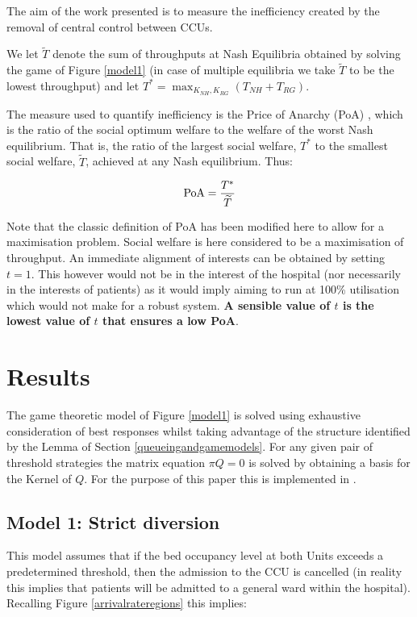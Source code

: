 \documentclass{article}
\begin{document}
The aim of the work presented is to measure the inefficiency created by the removal of central control between CCUs.

We let $\widetilde T$ denote the sum of throughputs at Nash Equilibria obtained by solving the game of Figure \ref{model1} (in case of multiple equilibria we take $\widetilde T$ to be the lowest throughput) and let $T^*=\max_{K_{NH}, K_{RG}}\left(T_{NH}+T_{RG}\right)$.

The measure used to quantify inefficiency is the Price of Anarchy (PoA) \cite{Koutsoupias1999,TimRoughgarden}, which is the ratio of the social optimum welfare to the welfare of the worst Nash equilibrium.
That is, the ratio of the largest social welfare, $T^*$ to the smallest social welfare, $\widetilde{T}$, achieved at any Nash equilibrium. Thus:

$$\text{PoA}={{T^*}\over{\widetilde{T}}}$$

Note that the classic definition of PoA has been modified here to allow for a maximisation problem.
Social welfare is here considered to be a maximisation of throughput.
An immediate alignment of interests can be obtained by setting $t=1$.
This however would not be in the interest of the hospital (nor necessarily in the interests of patients) as it would imply aiming to run at 100\% utilisation which would not make for a robust system.
\textbf{A sensible value of $t$ is the lowest value of $t$ that ensures a low PoA}.

\section{Results}\label{results}

The game theoretic model of Figure \ref{model1} is solved using exhaustive consideration of best responses whilst taking advantage of the structure identified by the Lemma of Section \ref{queueingandgamemodels}. For any given pair of threshold strategies the matrix equation $\pi Q=0$ is solved by obtaining a basis for the Kernel of $Q$. For the purpose of this paper this is implemented in \cite{sage}.

\subsection{Model 1: Strict diversion}

This model assumes that if the bed occupancy level at both Units exceeds a predetermined threshold, then the admission to the CCU is cancelled (in reality this implies that patients will be admitted to a general ward within the hospital).
Recalling Figure \ref{arrivalrateregions} this implies:
\end{document}
